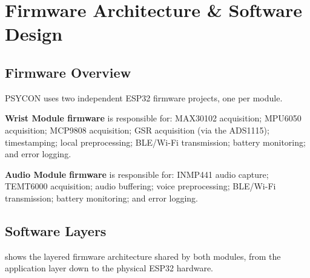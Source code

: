 \section{Firmware Architecture \& Software Design}
\label{sec:firmware-architecture}

\subsection{Firmware Overview}
\label{sec:firmware-overview}

PSYCON uses two independent ESP32 firmware projects, one per module.

\textbf{Wrist Module firmware} is responsible for: MAX30102 acquisition; MPU6050 acquisition; MCP9808 acquisition; GSR acquisition (via the ADS1115); timestamping; local preprocessing; BLE/Wi-Fi transmission; battery monitoring; and error logging.

\textbf{Audio Module firmware} is responsible for: INMP441 audio capture; TEMT6000 acquisition; audio buffering; voice preprocessing; BLE/Wi-Fi transmission; battery monitoring; and error logging.

\subsection{Software Layers}
\label{sec:software-layers}

 shows the layered firmware architecture shared by both modules, from the application layer down to the physical ESP32 hardware.


